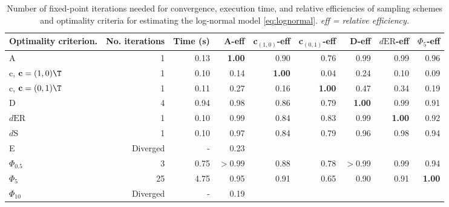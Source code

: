 \begin{table}[htb!]
\centering
\caption{Number of fixed-point iterations needed for convergence, execution time, and relative efficiencies of sampling schemes and optimality criteria for estimating the log-normal model \eqref{eq:lognormal}. \textit{eff = relative efficiency.}} 
\label{tab:baseline_impact_speed}
\begin{tabular}{lrrrrrrrr}
 Optimality criterion. & No. iterations & Time (s) & A-eff & c$_{(1,0)}$-eff & c$_{(0,1)}$-eff & D-eff & $d{\mathrm{ER}}$-eff & $\Phi_5$-eff \\ 
  \hline
A & 1 & 0.13 & \textbf{1.00} & 0.90 & 0.76 & 0.99 & 0.99 & 0.96 \\ 
  c, $\mathbf{c} = (1,0)\T$ & 1 & 0.10 & 0.14 & \textbf{1.00} & 0.04 & 0.24 & 0.10 & 0.09 \\ 
  c, $\mathbf{c} = (0,1)\T$ & 1 & 0.11 & 0.27 & 0.16 & \textbf{1.00} & 0.47 & 0.34 & 0.19 \\ 
  D & 4 & 0.94 & 0.98 & 0.86 & 0.79 & \textbf{1.00} & 0.99 & 0.91 \\ 
  $d{\mathrm{ER}}$ & 1 & 0.10 & 0.99 & 0.84 & 0.83 & 0.99 & \textbf{1.00} & 0.92 \\ 
  $d{\mathrm{S}}$ & 1 & 0.10 & 0.97 & 0.84 & 0.79 & 0.96 & 0.98 & 0.94 \\ 
  E & Diverged & - & 0.23 &  &  &  &  &  \\ 
  $\Phi_{0.5}$ & 3 & 0.75 & $>$0.99 & 0.88 & 0.78 & $>$0.99 & 0.99 & 0.94 \\ 
  $\Phi_5$ & 25 & 4.75 & 0.95 & 0.91 & 0.65 & 0.90 & 0.91 & \textbf{1.00} \\ 
  $\Phi_{10}$ & Diverged & - & 0.19 &  &  &  &  &  \\ 
   \hline
\end{tabular}
\end{table}
